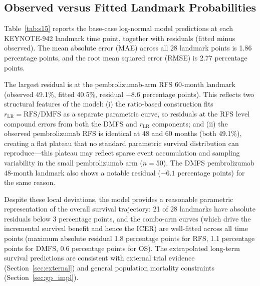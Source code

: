 \documentclass[11pt,a4paper]{article}
\begin{document}
\subsection{Observed versus Fitted Landmark Probabilities}
\label{sec:obs_fitted}

Table~\ref{tab:s15} reports the base-case log-normal model predictions at each KEYNOTE-942 landmark time point, together with residuals (fitted minus observed). The mean absolute error (MAE) across all 28 landmark points is 1.86 percentage points, and the root mean squared error (RMSE) is 2.77 percentage points.

The largest residual is at the pembrolizumab-arm RFS 60-month landmark (observed 49.1\%, fitted 40.5\%, residual $-8.6$ percentage points). This reflects two structural features of the model: (i) the ratio-based construction fits $r_{\text{LR}} = \text{RFS}/\text{DMFS}$ as a separate parametric curve, so residuals at the RFS level compound errors from both the DMFS and $r_{\text{LR}}$ components; and (ii) the observed pembrolizumab RFS is identical at 48 and 60 months (both 49.1\%), creating a flat plateau that no standard parametric survival distribution can reproduce---this plateau may reflect sparse event accumulation and sampling variability in the small pembrolizumab arm ($n=50$). The DMFS pembrolizumab 48-month landmark also shows a notable residual ($-6.1$ percentage points) for the same reason.

Despite these local deviations, the model provides a reasonable parametric representation of the overall survival trajectory: 21 of 28 landmarks have absolute residuals below 3 percentage points, and the combo-arm curves (which drive the incremental survival benefit and hence the ICER) are well-fitted across all time points (maximum absolute residual 1.8 percentage points for RFS, 1.1 percentage points for DMFS, 0.6 percentage points for OS). The extrapolated long-term survival predictions are consistent with external trial evidence (Section~\ref{sec:external}) and general population mortality constraints (Section~\ref{sec:gp_impl}).
\end{document}
